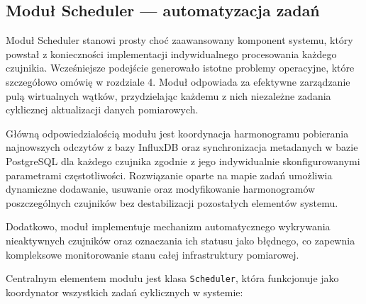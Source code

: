 \documentclass[a4paper,12pt,openany]{book}
\begin{document}
\subsection{Moduł Scheduler --- automatyzacja zadań}

Moduł Scheduler stanowi prosty choć zaawansowany komponent systemu, który powstał z konieczności implementacji indywidualnego procesowania każdego czujnikia. Wcześniejsze podejście generowało istotne problemy operacyjne, które szczegółowo omówię w rozdziale 4. Moduł odpowiada za efektywne zarządzanie pulą wirtualnych wątków, przydzielając każdemu z nich niezależne zadania cyklicznej aktualizacji danych pomiarowych.

Główną odpowiedzialością modułu jest koordynacja harmonogramu pobierania najnowszych odczytów z bazy InfluxDB oraz synchronizacja metadanych w bazie PostgreSQL dla każdego czujnika zgodnie z jego indywidualnie skonfigurowanymi parametrami częstotliwości. Rozwiązanie oparte na mapie zadań umożliwia dynamiczne dodawanie, usuwanie oraz modyfikowanie harmonogramów poszczególnych czujników bez destabilizacji pozostałych elementów systemu.

Dodatkowo, moduł implementuje mechanizm automatycznego wykrywania nieaktywnych czujników oraz oznaczania ich statusu jako błędnego, co zapewnia kompleksowe monitorowanie stanu całej infrastruktury pomiarowej.

Centralnym elementem modułu jest klasa \texttt{Scheduler}, która funkcjonuje jako koordynator wszystkich zadań cyklicznych w systemie:
\end{document}

